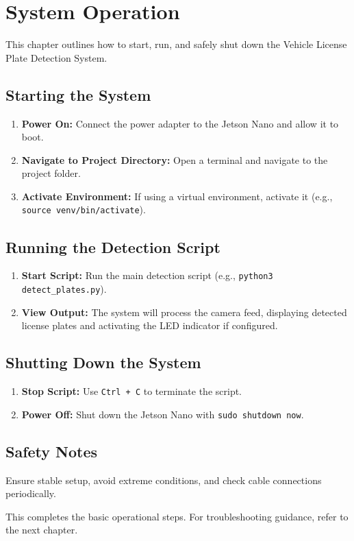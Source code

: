 %
%

\chapter{System Operation}

This chapter outlines how to start, run, and safely shut down the Vehicle License Plate Detection System.

\section{Starting the System}
\begin{enumerate}
	\item \textbf{Power On:} Connect the power adapter to the Jetson Nano and allow it to boot.
	\item \textbf{Navigate to Project Directory:} Open a terminal and navigate to the project folder.
	\item \textbf{Activate Environment:} If using a virtual environment, activate it (e.g., \texttt{source venv/bin/activate}).
\end{enumerate}

\section{Running the Detection Script}
\begin{enumerate}
	\item \textbf{Start Script:} Run the main detection script (e.g., \texttt{python3 detect\_plates.py}).
	\item \textbf{View Output:} The system will process the camera feed, displaying detected license plates and activating the LED indicator if configured.
\end{enumerate}

\section{Shutting Down the System}
\begin{enumerate}
	\item \textbf{Stop Script:} Use \texttt{Ctrl + C} to terminate the script.
	\item \textbf{Power Off:} Shut down the Jetson Nano with \texttt{sudo shutdown now}.
\end{enumerate}

\section{Safety Notes}
Ensure stable setup, avoid extreme conditions, and check cable connections periodically.

This completes the basic operational steps. For troubleshooting guidance, refer to the next chapter.